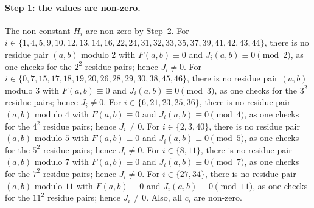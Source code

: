 \documentclass[11pt]{article}
\begin{document}
\paragraph{Step 1: the values are non-zero.} The non-constant $H_i$ are non-zero by Step~2. For $i\in\{1,\allowbreak 4,\allowbreak 5,\allowbreak 9,\allowbreak 10,\allowbreak 12,\allowbreak 13,\allowbreak 14,\allowbreak 16,\allowbreak 22,\allowbreak 24,\allowbreak 31,\allowbreak 32,\allowbreak 33,\allowbreak 35,\allowbreak 37,\allowbreak 39,\allowbreak 41,\allowbreak 42,\allowbreak 43,\allowbreak 44\}$, there is no residue pair $(a,b)$ modulo $2$ with $F(a,b)\equiv0$ and $J_i(a,b)\equiv0\pmod{2}$, as one checks for the $2^2$ residue pairs; hence $J_i\neq0$. For $i\in\{0,\allowbreak 7,\allowbreak 15,\allowbreak 17,\allowbreak 18,\allowbreak 19,\allowbreak 20,\allowbreak 26,\allowbreak 28,\allowbreak 29,\allowbreak 30,\allowbreak 38,\allowbreak 45,\allowbreak 46\}$, there is no residue pair $(a,b)$ modulo $3$ with $F(a,b)\equiv0$ and $J_i(a,b)\equiv0\pmod{3}$, as one checks for the $3^2$ residue pairs; hence $J_i\neq0$. For $i\in\{6,\allowbreak 21,\allowbreak 23,\allowbreak 25,\allowbreak 36\}$, there is no residue pair $(a,b)$ modulo $4$ with $F(a,b)\equiv0$ and $J_i(a,b)\equiv0\pmod{4}$, as one checks for the $4^2$ residue pairs; hence $J_i\neq0$. For $i\in\{2,\allowbreak 3,\allowbreak 40\}$, there is no residue pair $(a,b)$ modulo $5$ with $F(a,b)\equiv0$ and $J_i(a,b)\equiv0\pmod{5}$, as one checks for the $5^2$ residue pairs; hence $J_i\neq0$. For $i\in\{8,\allowbreak 11\}$, there is no residue pair $(a,b)$ modulo $7$ with $F(a,b)\equiv0$ and $J_i(a,b)\equiv0\pmod{7}$, as one checks for the $7^2$ residue pairs; hence $J_i\neq0$. For $i\in\{27,\allowbreak 34\}$, there is no residue pair $(a,b)$ modulo $11$ with $F(a,b)\equiv0$ and $J_i(a,b)\equiv0\pmod{11}$, as one checks for the $11^2$ residue pairs; hence $J_i\neq0$. Also, all $c_i$ are non-zero.
\end{document}
